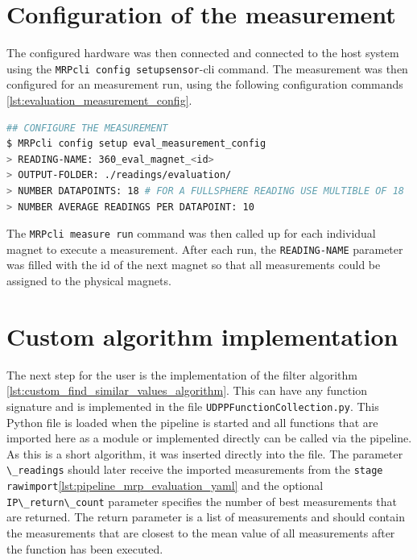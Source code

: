 \hypertarget{configuration-of-the-measurement}{%
\section{Configuration of the
measurement}\label{configuration-of-the-measurement}}

The configured hardware was then connected and connected to the host
system using the
\passthrough{\lstinline!MRPcli config setupsensor!}-\gls{cli} command.
The measurement was then configured for an measurement run, using the
following configuration commands
\ref{lst:evaluation_measurement_config}.

\begin{lstlisting}[language=bash, caption={Measurement configuration for evaluation measurement}, label=lst:evaluation_measurement_config]
## CONFIGURE THE MEASUREMENT
$ MRPcli config setup eval_measurement_config
> READING-NAME: 360_eval_magnet_<id>
> OUTPUT-FOLDER: ./readings/evaluation/ 
> NUMBER DATAPOINTS: 18 # FOR A FULLSPHERE READING USE MULTIBLE OF 18
> NUMBER AVERAGE READINGS PER DATAPOINT: 10
\end{lstlisting}

The \passthrough{\lstinline!MRPcli measure run!} command was then called
up for each individual magnet to execute a measurement. After each run,
the \passthrough{\lstinline!READING-NAME!} parameter was filled with the
id of the next magnet so that all measurements could be assigned to the
physical magnets.

\hypertarget{custom-algorithm-implementation}{%
\section{Custom algorithm
implementation}\label{custom-algorithm-implementation}}

The next step for the user is the implementation of the filter algorithm
\ref{lst:custom_find_similar_values_algorithm}. This can have any
function signature and is implemented in the file
\passthrough{\lstinline!UDPPFunctionCollection.py!}. This Python file is
loaded when the pipeline is started and all functions that are imported
here as a module or implemented directly can be called via the pipeline.
As this is a short algorithm, it was inserted directly into the file.
The parameter \passthrough{\lstinline!\_readings!} should later receive
the imported measurements from the
\passthrough{\lstinline!stage rawimport!}\ref{lst:pipeline_mrp_evaluation_yaml}
and the optional \passthrough{\lstinline!IP\_return\_count!} parameter
specifies the number of best measurements that are returned. The return
parameter is a list of measurements and should contain the measurements
that are closest to the mean value of all measurements after the
function has been executed.

